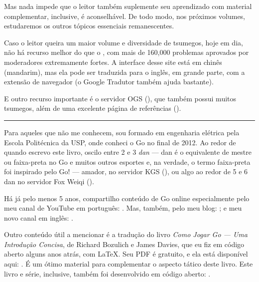 Mas nada impede que o leitor também suplemente seu aprendizado com material complementar, inclusive, é aconselhável. De todo modo, nos próximos volumes, estudaremos os outros tópicos essenciais remanescentes.

Caso o leitor queira um maior volume e diversidade de tsumegos, hoje em dia, não há recurso melhor do que o , com mais de 160,000 problemas aprovados por moderadores extremamente fortes. A interface desse site está em chinês (mandarim), mas ela pode ser traduzida para o inglês, em grande parte, com a extensão de navegador  (o Google Tradutor também ajuda bastante).

E outro recurso importante é o servidor OGS (), que também possui muitos tsumegos, além de uma excelente página de referências ().

\vspace{-0.05cm}

\begin{center}
  \rule{3.25cm}{0.15mm}
\end{center}

\vspace{0.1cm}

Para aqueles que não me conhecem, sou formado em engenharia elétrica pela Escola Politécnica da USP, onde conheci o Go no final de 2012. Ao redor de quando escrevo este livro, oscilo entre 2 e 3 \emph{\gls{dan}} --- dan é o equivalente de mestre ou faixa-preta no Go e muitos outros esportes e, na verdade, o termo faixa-preta foi inspirado pelo Go! --- amador, no servidor KGS (), ou algo ao redor de 5 e 6 dan no servidor Fox Weiqi ().

Há já pelo menos 5 anos, compartilho conteúdo de Go online especialmente pelo meu canal de YouTube em português: . Mas, também, pelo meu blog: ; e meu novo canal em inglês: .

Outro conteúdo útil a mencionar é a tradução do livro \emph{Como Jogar Go --- Uma Introdução Concisa}, de Richard Bozulich e James Davies, que eu fiz em código aberto alguns anos atrás, com \LaTeX. Seu PDF é gratuito, e ela está disponível aqui: . É um ótimo material para complementar o aspecto tático deste livro. Este livro e série, inclusive, também foi desenvolvido em código aberto: .

